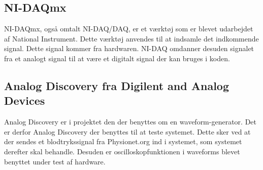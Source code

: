 \subsection{NI-DAQmx}
NI-DAQmx, også omtalt NI-DAQ/DAQ, er et værktøj som er blevet udarbejdet af National Instrument. Dette værktøj anvendes til at indsamle det indkommende signal. Dette signal kommer fra hardwaren. NI-DAQ omdanner desuden signalet fra et analogt signal til at være et digitalt signal der kan bruges i koden. 
\subsection{Analog Discovery fra Digilent and Analog Devices}
Analog Discovery er i projektet den der benyttes om en waveform-generator. Det er derfor Analog Discovery der benyttes til at teste systemet. Dette sker ved at der sendes et blodtrykssignal fra Physionet.org ind i systemet, som systemet derefter skal behandle. Desuden er oscilloskopfunktionen i waveforms blevet benyttet under test af hardware.
